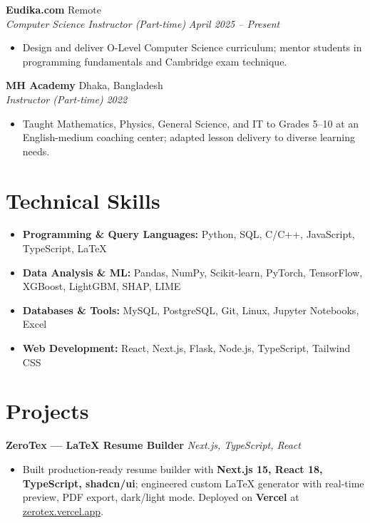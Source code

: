 \documentclass[10pt,a4paper]{article}
\newenvironment{project}{
    \begin{itemize}[leftmargin=1.0em, itemsep=1pt, topsep=1pt, parsep=1pt]
}{
    \end{itemize}
}
\begin{document}
\noindent\textbf{Eudika.com} \hfill Remote\\
\noindent\textit{Computer Science Instructor (Part-time)} \hfill \textit{April 2025 -- Present}
\begin{project}
    \item Design and deliver O-Level Computer Science curriculum; mentor students in programming fundamentals and Cambridge exam technique.
\end{project}
\vspace{4pt}

\noindent\textbf{MH Academy} \hfill Dhaka, Bangladesh\\
\noindent\textit{Instructor (Part-time)} \hfill \textit{2022}
\begin{project}
    \item Taught Mathematics, Physics, General Science, and IT to Grades 5--10 at an English-medium coaching center; adapted lesson delivery to diverse learning needs.
\end{project}
\vspace{2pt}

\section*{Technical Skills}
\begin{itemize}
    \item \textbf{Programming \& Query Languages:} Python, SQL, C/C++, JavaScript, TypeScript, LaTeX
    \item \textbf{Data Analysis \& ML:} Pandas, NumPy, Scikit-learn, PyTorch, TensorFlow, XGBoost, LightGBM, SHAP, LIME
    \item \textbf{Databases \& Tools:} MySQL, PostgreSQL, Git, Linux, Jupyter Notebooks, Excel
    \item \textbf{Web Development:} React, Next.js, Flask, Node.js, TypeScript, Tailwind CSS
\end{itemize}
\vspace{2pt}

\section*{Projects}

\noindent\textbf{ZeroTex --- LaTeX Resume Builder} \hfill \textit{Next.js, TypeScript, React}
\begin{project}
    \item Built production-ready resume builder with \textbf{Next.js 15, React 18, TypeScript, shadcn/ui}; engineered custom LaTeX generator with real-time preview, PDF export, dark/light mode. Deployed on \textbf{Vercel} at \href{https://zerotex.vercel.app}{zerotex.vercel.app}.
\end{project}
\vspace{4pt}
\end{document}
